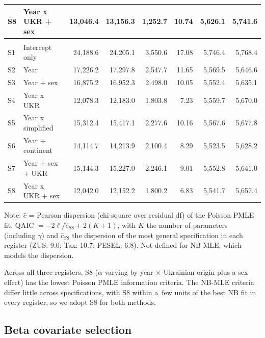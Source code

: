 \begin{table}[ht!]
\begin{tabular*}{\linewidth}{@{\extracolsep{\fill}}llrrrrrr}
S8 & Year x UKR + sex & 13,046.4 & 13,156.3 & 1,252.7 & 10.74 & 5,626.1 & 5,741.6 \\ 
\midrule\addlinespace[2.5pt]
\multicolumn{8}{l}{PESEL} \\[2.5pt] 
\midrule\addlinespace[2.5pt]
S1 & Intercept only & 24,188.6 & 24,205.1 & 3,550.6 & 17.08 & 5,746.4 & 5,768.4 \\ 
S2 & Year & 17,226.2 & 17,297.8 & 2,547.7 & 11.65 & 5,569.5 & 5,646.6 \\ 
S3 & Year + sex & 16,875.2 & 16,952.3 & 2,498.0 & 10.05 & 5,552.4 & 5,635.1 \\ 
S4 & Year x UKR & 12,078.3 & 12,183.0 & 1,803.8 & 7.23 & 5,559.7 & 5,670.0 \\ 
S5 & Year x simplified & 15,312.4 & 15,417.1 & 2,277.6 & 10.16 & 5,567.6 & 5,677.8 \\ 
S6 & Year + continent & 14,114.7 & 14,213.9 & 2,100.4 & 8.29 & 5,523.5 & 5,628.2 \\ 
S7 & Year + sex + UKR & 15,144.3 & 15,227.0 & 2,246.1 & 9.01 & 5,552.8 & 5,641.0 \\ 
S8 & Year x UKR + sex & 12,042.0 & 12,152.2 & 1,800.2 & 6.83 & 5,541.7 & 5,657.4 \\ 
\bottomrule
\end{tabular*}
\begin{minipage}{\linewidth}
\vspace{.05em}
Note: $\hat c$ = Pearson dispersion (chi-square over residual df) of the Poisson PMLE fit. QAIC $= -2\ell/\hat c_{S8} + 2(K+1)$, with $K$ the number of parameters (including $\gamma$) and $\hat c_{S8}$ the dispersion of the most general specification in each register (ZUS: 9.0; Tax: 10.7; PESEL: 6.8). Not defined for NB-MLE, which models the dispersion.\\
\end{minipage}
\end{table}


Across all three registers, S8 ($\alpha$ varying by year $\times$ Ukrainian origin plus a sex effect) has the lowest Poisson PMLE information criteria. The NB-MLE criteria differ little across specifications, with S8 within a~few units of the best NB fit in every register, so we adopt S8 for both methods.
  

\clearpage

\subsection{Beta covariate selection}\label{sec-appendix-beta-selection}

